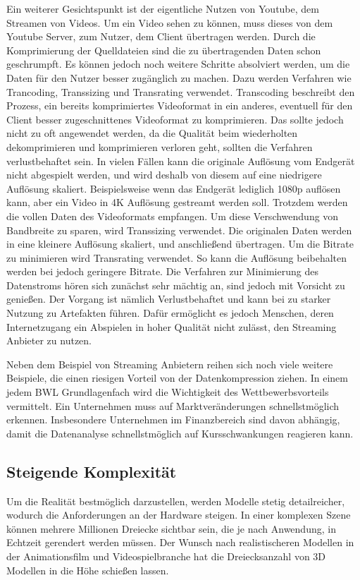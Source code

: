 Ein weiterer Gesichtspunkt ist der eigentliche Nutzen von Youtube, dem Streamen von Videos.
Um ein Video sehen zu können, muss dieses von dem Youtube Server, zum Nutzer, dem Client übertragen werden.
Durch die Komprimierung der Quelldateien sind die zu übertragenden Daten schon geschrumpft.
Es können jedoch noch weitere Schritte absolviert werden, um die Daten für den Nutzer besser zugänglich zu machen.
Dazu werden Verfahren wie Trancoding, Transsizing und Transrating verwendet.
Transcoding beschreibt den Prozess, ein bereits komprimiertes Videoformat in ein anderes, eventuell für den Client besser zugeschnittenes Videoformat zu komprimieren.
Das sollte jedoch nicht zu oft angewendet werden, da die Qualität beim wiederholten dekomprimieren und komprimieren verloren geht, sollten die Verfahren verlustbehaftet sein. \newline
In vielen Fällen kann die originale Auflösung vom Endgerät nicht abgespielt werden, und wird deshalb von diesem auf eine niedrigere Auflösung skaliert.
Beispielsweise wenn das Endgerät lediglich 1080p auflösen kann, aber ein Video in 4K Auflösung gestreamt werden soll.
Trotzdem werden die vollen Daten des Videoformats empfangen.
Um diese Verschwendung von Bandbreite zu sparen, wird Transsizing verwendet.
Die originalen Daten werden in eine kleinere Auflösung skaliert, und anschließend übertragen. \newline
Um die Bitrate zu minimieren wird Transrating verwendet.
So kann die Auflösung beibehalten werden bei jedoch geringere Bitrate.
Die Verfahren zur Minimierung des Datenstroms hören sich zunächst sehr mächtig an, sind jedoch mit Vorsicht zu genießen.
Der Vorgang ist nämlich Verlustbehaftet und kann bei zu starker Nutzung zu Artefakten führen.
Dafür ermöglicht es jedoch Menschen, deren Internetzugang ein Abspielen in hoher Qualität nicht zulässt, den Streaming Anbieter zu nutzen. \newline

Neben dem Beispiel von Streaming Anbietern reihen sich noch viele weitere Beispiele, die einen riesigen Vorteil von der Datenkompression ziehen.
In einem jedem BWL Grundlagenfach wird die Wichtigkeit des Wettbewerbsvorteils vermittelt.
Ein Unternehmen muss auf Marktveränderungen schnellstmöglich erkennen.
Insbesondere Unternehmen im Finanzbereich sind davon abhängig, damit die Datenanalyse schnellstmöglich auf Kursschwankungen reagieren kann.

\subsection{Steigende Komplexität}
\label{subsec:steigende_komplexität}
Um die Realität bestmöglich darzustellen, werden Modelle stetig detailreicher, wodurch die Anforderungen an der Hardware steigen. In einer komplexen Szene können mehrere Millionen Dreiecke sichtbar sein, die je nach Anwendung, in Echtzeit gerendert werden müssen. Der Wunsch nach realistischeren Modellen in der Animationsfilm und Videospielbranche hat die Dreiecksanzahl von 3D Modellen in die Höhe schießen lassen. \newline

